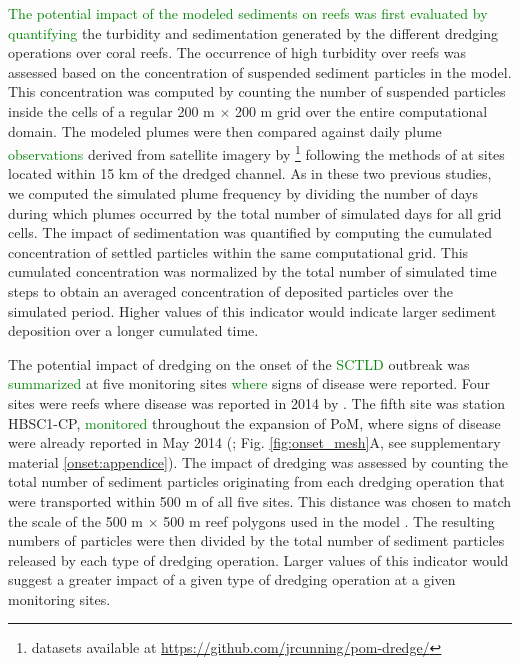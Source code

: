 \documentclass[preprint,12pt,authoryear]{elsarticle}
\newcommand{\modif}[1]{\textcolor{green}{#1}}
\begin{document}
\modif{The potential impact of the modeled sediments on reefs was first evaluated by quantifying} the turbidity and sedimentation generated by the different dredging operations over coral reefs. The occurrence of high turbidity over reefs was assessed based on the concentration of suspended sediment particles in the model. This concentration was computed by counting the number of suspended particles inside the cells of a regular 200 m $\times$ 200 m grid over the entire computational domain. The modeled plumes were then compared against daily plume \modif{observations} derived from satellite imagery by \cite{cunning2019extensive}\footnote{datasets available at \url{https://github.com/jrcunning/pom-dredge/}} following the methods of \cite{barnes2015sediment} at sites located within 15 km of the dredged channel. As in these two previous studies, we computed  the simulated plume frequency by dividing the number of days during which plumes occurred by the total number of simulated days for all grid cells. The impact of sedimentation was quantified by computing the cumulated concentration of settled particles within the same computational grid. This cumulated concentration was normalized by the total number of simulated time steps to obtain an averaged concentration of deposited particles over the simulated period. Higher values of this indicator would indicate larger sediment deposition over a longer cumulated time.

The potential impact of dredging on the onset of the \modif{SCTLD} outbreak was \modif{summarized} at five monitoring sites \modif{where} signs of disease were reported. Four sites were reefs where disease was reported in 2014 by \cite{precht2016unprecedented}. The fifth site was station HBSC1-CP, \modif{monitored} throughout the expansion of PoM, where signs of disease were already reported in May 2014 (\citealp{dial2017}; Fig. \ref{fig:onset_mesh}A, see supplementary material \ref{onset:appendice}). The impact of dredging was assessed by counting the total number of sediment particles originating from each dredging operation that were transported within 500 m of all five sites. This distance was chosen to match the scale of the 500 m $\times$ 500 m reef polygons used in the model \citep{dobbelaere2020coupled}. The resulting numbers of particles were then divided by the total number of sediment particles released by each type of dredging operation. Larger values of this indicator would suggest a greater impact of a given type of dredging operation at a given monitoring sites.  
\end{document}
